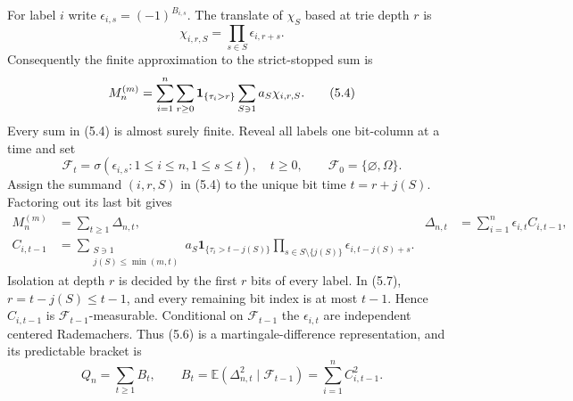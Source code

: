 \documentclass[11pt]{article}
\numberwithin{equation}{section}
\newcommand{\E}{\mathbb E}\newcommand{\Pp}{\mathbb P}
\newcommand{\1}{\mathbf 1}\newcommand{\F}{\mathcal F}\newcommand{\D}{\mathcal D}
\begin{document}
For label $i$ write $\epsilon_{i,s}=(-1)^{B_{i,s}}$.  The translate of
$\chi_S$ based at trie depth $r$ is
\begin{equation}
 \chi_{i,r,S}=\prod_{s\in S}\epsilon_{i,r+s}.                \tag{5.3}
\end{equation}
Consequently the finite approximation to the strict-stopped sum is
\begin{equation}
 M_n^{(m)}=\sum_{i=1}^n\sum_{r\ge0}{\bf1}_{\{\tau_i>r\}}
                   \sum_{S\ni1}a_S\chi_{i,r,S}.              \tag{5.4}
\end{equation}
Every sum in (5.4) is almost surely finite.  Reveal all labels one bit-column
at a time and set
\begin{equation}
 \mathcal F_t=\sigma(\epsilon_{i,s}:1\le i\le n,1\le s\le t),
 \quad t\ge0,\qquad \mathcal F_0=\{\varnothing,\Omega\}.      \tag{5.5}
\end{equation}
Assign the summand $(i,r,S)$ in (5.4) to the unique bit time
$t=r+j(S)$.  Factoring out its last bit gives
\begin{align}
 M_n^{(m)}&=\sum_{t\ge1}\Delta_{n,t},
 &\Delta_{n,t}&=\sum_{i=1}^n\epsilon_{i,t}C_{i,t-1},          \tag{5.6}\\
 C_{i,t-1}&=\sum_{\substack{S\ni1\\j(S)\le\min(m,t)}}a_S
 {\mathbf 1}_{\{\tau_i>t-j(S)\}}
 \prod_{s\in S\setminus\{j(S)\}}
       \epsilon_{i,t-j(S)+s}.                                \tag{5.7}
\end{align}
Isolation at depth $r$ is decided by the first $r$ bits of every label.
In (5.7), $r=t-j(S)\le t-1$, and every remaining bit index is at most
$t-1$.  Hence $C_{i,t-1}$ is $\mathcal F_{t-1}$-measurable.  Conditional on
$\mathcal F_{t-1}$ the $\epsilon_{i,t}$ are independent centered
Rademachers.  Thus (5.6) is a martingale-difference representation, and its
predictable bracket is
\begin{equation}
 Q_n=\sum_{t\ge1}B_t,
 \qquad B_t=\E(\Delta_{n,t}^2\mid\mathcal F_{t-1})
            =\sum_{i=1}^n C_{i,t-1}^2.                        \tag{5.8}
\end{equation}
\end{document}
